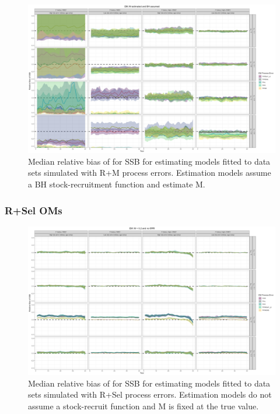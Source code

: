 \documentclass[
  12pt,
]{article}
\begin{document}
\begin{landscape}
\begin{figure}
\caption{Median relative bias of for SSB for estimating models fitted to data sets simulated with R+M process errors. Estimation models assume a BH stock-recruitment function and estimate M.}\label{M_om_em_BH_ME_relbias_ssb}
\begin{center}
\includegraphics[width = \textwidth]{M_om_BH_ME_relbias_ssb.png}
\end{center}
\end{figure}
\end{landscape}

\hypertarget{rsel-oms}{%
\subsubsection*{R+Sel OMs}\label{rsel-oms}}

\begin{landscape}
\begin{figure}
\caption{Median relative bias of for SSB for estimating models fitted to data sets simulated with R+Sel process errors.  Estimation models do not assume a stock-recruit function and M is fixed at the true value.}\label{Sel_om_em_R_MF_relbias_ssb}
\begin{center}
\includegraphics[width = \textwidth]{Sel_om_R_MF_relbias_ssb.png}
\end{center}
\end{figure}
\end{landscape}
\end{document}
